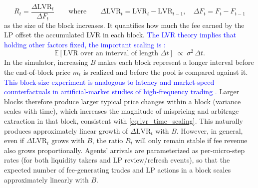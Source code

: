 \documentclass[11pt]{article}
\begin{document}
\begin{equation}
    R_t = \frac{\Delta \text{LVR}_t}{\Delta F_t} \qquad \text{where} \qquad \Delta \text{LVR}_t = \text{LVR}_t-\text{LVR}_{t-1} ,\quad \Delta F_t=F_t-F_{t-1}
\end{equation}
as the size of the block increases. It quantifies how much the fee earned by the LP offset the accumulated LVR in each block.
\textcolor{blue}{The LVR theory implies that holding other factors fixed, the important scaling is \cite{milionis2023}:}
\begin{equation}
  \mathbb{E}[\mathrm{LVR} \text{ over an interval of length } \Delta t]
  \;\propto\;
  \sigma^2 \,\Delta t.
  \label{eq:lvr_time_scaling}
\end{equation}
In the simulator, increasing $B$ makes each block represent a longer interval before the end-of-block price
$m_t$ is realized and before the pool is compared against it. \textcolor{blue}{This block-size experiment is analogous to latency and market-speed counterfactuals in artificial-market studies of high-frequency trading \cite{leal2016,gao2024}.} Larger blocks therefore produce larger typical price
changes within a block (variance scales with time), which increases the magnitude of mispricing and arbitrage 
extraction in that block, consistent with \eqref{eq:lvr_time_scaling}. This naturally produces approximately linear 
growth of $\Delta\text{LVR}_t$ with $B$. However, in general, even if $\Delta\mathrm{LVR}_t$ grows with $B$, the 
ratio $R_t$ will only remain stable if fee revenue also grows proportionally.
Agents' arrivals are parameterized as per-micro-step rates (for both liquidity takers and LP review/refresh events), 
so that the expected number of fee-generating trades and LP actions in a block scales approximately linearly with $B$. 
\end{document}
